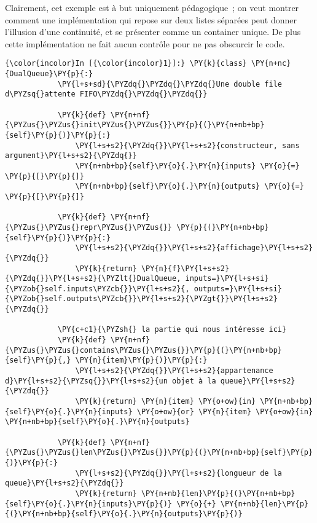 Clairement, cet exemple est à but uniquement pédagogique~; on veut
montrer comment une implémentation qui repose sur deux listes séparées
peut donner l'illusion d'une continuité, et se présenter comme un
container unique. De plus cette implémentation ne fait aucun contrôle
pour ne pas obscurcir le code.

    \begin{Verbatim}[commandchars=\\\{\}]
{\color{incolor}In [{\color{incolor}1}]:} \PY{k}{class} \PY{n+nc}{DualQueue}\PY{p}{:}
            \PY{l+s+sd}{\PYZdq{}\PYZdq{}\PYZdq{}Une double file d\PYZsq{}attente FIFO\PYZdq{}\PYZdq{}\PYZdq{}}
        
            \PY{k}{def} \PY{n+nf}{\PYZus{}\PYZus{}init\PYZus{}\PYZus{}}\PY{p}{(}\PY{n+nb+bp}{self}\PY{p}{)}\PY{p}{:}
                \PY{l+s+s2}{\PYZdq{}}\PY{l+s+s2}{constructeur, sans argument}\PY{l+s+s2}{\PYZdq{}}
                \PY{n+nb+bp}{self}\PY{o}{.}\PY{n}{inputs} \PY{o}{=} \PY{p}{[}\PY{p}{]}
                \PY{n+nb+bp}{self}\PY{o}{.}\PY{n}{outputs} \PY{o}{=} \PY{p}{[}\PY{p}{]}
        
            \PY{k}{def} \PY{n+nf}{\PYZus{}\PYZus{}repr\PYZus{}\PYZus{}} \PY{p}{(}\PY{n+nb+bp}{self}\PY{p}{)}\PY{p}{:}
                \PY{l+s+s2}{\PYZdq{}}\PY{l+s+s2}{affichage}\PY{l+s+s2}{\PYZdq{}}
                \PY{k}{return} \PY{n}{f}\PY{l+s+s2}{\PYZdq{}}\PY{l+s+s2}{\PYZlt{}DualQueue, inputs=}\PY{l+s+si}{\PYZob{}self.inputs\PYZcb{}}\PY{l+s+s2}{, outputs=}\PY{l+s+si}{\PYZob{}self.outputs\PYZcb{}}\PY{l+s+s2}{\PYZgt{}}\PY{l+s+s2}{\PYZdq{}}
        
            \PY{c+c1}{\PYZsh{} la partie qui nous intéresse ici}
            \PY{k}{def} \PY{n+nf}{\PYZus{}\PYZus{}contains\PYZus{}\PYZus{}}\PY{p}{(}\PY{n+nb+bp}{self}\PY{p}{,} \PY{n}{item}\PY{p}{)}\PY{p}{:}
                \PY{l+s+s2}{\PYZdq{}}\PY{l+s+s2}{appartenance d}\PY{l+s+s2}{\PYZsq{}}\PY{l+s+s2}{un objet à la queue}\PY{l+s+s2}{\PYZdq{}}
                \PY{k}{return} \PY{n}{item} \PY{o+ow}{in} \PY{n+nb+bp}{self}\PY{o}{.}\PY{n}{inputs} \PY{o+ow}{or} \PY{n}{item} \PY{o+ow}{in} \PY{n+nb+bp}{self}\PY{o}{.}\PY{n}{outputs}
            
            \PY{k}{def} \PY{n+nf}{\PYZus{}\PYZus{}len\PYZus{}\PYZus{}}\PY{p}{(}\PY{n+nb+bp}{self}\PY{p}{)}\PY{p}{:}
                \PY{l+s+s2}{\PYZdq{}}\PY{l+s+s2}{longueur de la queue}\PY{l+s+s2}{\PYZdq{}}
                \PY{k}{return} \PY{n+nb}{len}\PY{p}{(}\PY{n+nb+bp}{self}\PY{o}{.}\PY{n}{inputs}\PY{p}{)} \PY{o}{+} \PY{n+nb}{len}\PY{p}{(}\PY{n+nb+bp}{self}\PY{o}{.}\PY{n}{outputs}\PY{p}{)}        
        

\end{Verbatim}
